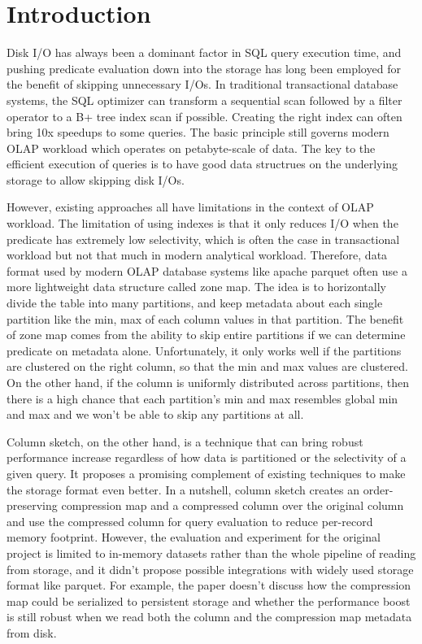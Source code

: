 \section{Introduction}

Disk I/O has always been a dominant factor in SQL query execution time, and pushing predicate evaluation down into the storage has long been employed for the benefit of skipping unnecessary I/Os.
In traditional transactional database systems, the SQL optimizer can transform a sequential scan followed by a filter operator to a B+ tree index scan if possible. 
Creating the right index can often bring 10x speedups to some queries. 
The basic principle still governs modern OLAP workload which operates on petabyte-scale of data.
The key to the efficient execution of queries is to have good data structrues on the underlying storage to allow skipping disk I/Os.

However, existing approaches all have limitations in the context of OLAP workload\cite{Xinyu23}.
The limitation of using indexes is that it only reduces I/O when the predicate has extremely low selectivity, which is often the case in transactional workload but not that much in modern analytical workload.
Therefore, data format used by modern OLAP database systems like apache parquet\cite{Parquet} often use a more lightweight data structure called zone map.
The idea is to horizontally divide the table into many partitions, and keep metadata about each single partition like the min, max of each column values in that partition.
The benefit of zone map comes from the ability to skip entire partitions if we can determine predicate on metadata alone. 
Unfortunately, it only works well if the partitions are clustered on the right column, so that the min and max values are clustered.
On the other hand, if the column is uniformly distributed across partitions, then there is a high chance that each partition's min and max resembles global min and max and we won't be able to skip any partitions at all.

Column sketch, on the other hand, is a technique that can bring robust performance increase regardless of how data is partitioned or the selectivity of a given query\cite{Brian18}.
It proposes a promising complement of existing techniques to make the storage format even better.
In a nutshell, column sketch creates an order-preserving compression map and a compressed column over the original column and use the compressed column for query evaluation to reduce per-record memory footprint.
However, the evaluation and experiment for the original project is limited to in-memory datasets rather than the whole pipeline of reading from storage, and it didn't propose possible integrations with widely used storage format like parquet.
For example, the paper doesn't discuss how the compression map could be serialized to persistent storage and whether the performance boost is still robust when we read both the column and the compression map metadata from disk.

